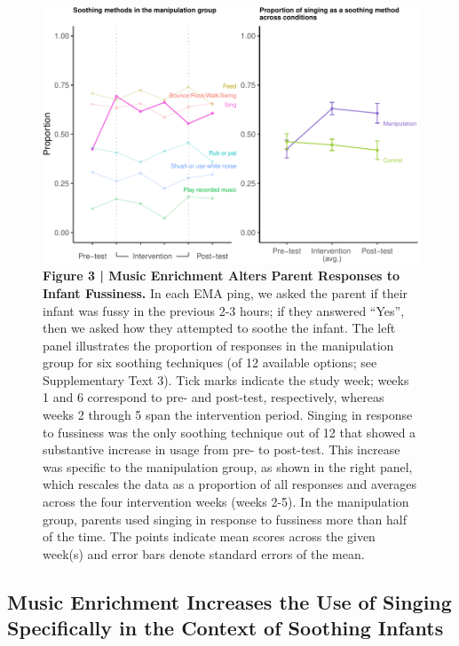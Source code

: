 \documentclass[
]{article}
\begin{document}
\begin{figure}[p]

{\centering \includegraphics{MIPH_childdev_files/figure-latex/figure-3AB-1} 

}

\caption{\textbf{Figure 3 | Music Enrichment Alters Parent Responses to Infant Fussiness.} In each EMA ping, we asked the parent if their infant was fussy in the previous 2-3 hours; if they answered ``Yes'', then we asked how they attempted to soothe the infant. The left panel illustrates the proportion of responses in the manipulation group for six soothing techniques (of 12 available options; see Supplementary Text 3). Tick marks indicate the study week; weeks 1 and 6 correspond to pre- and post-test, respectively, whereas weeks 2 through 5 span the intervention period. Singing in response to fussiness was the only soothing technique out of 12 that showed a substantive increase in usage from pre- to post-test. This increase was specific to the manipulation group, as shown in the right panel, which rescales the data as a proportion of all responses and averages across the four intervention weeks (weeks 2-5). In the manipulation group, parents used singing in response to fussiness more than half of the time. The points indicate mean scores across the given week(s) and error bars denote standard errors of the mean.}\label{fig:figure-3AB}
\end{figure}

\subsection{Music Enrichment Increases the Use of Singing Specifically
in the Context of Soothing
Infants}\label{music-enrichment-increases-the-use-of-singing-specifically-in-the-context-of-soothing-infants}
\end{document}
